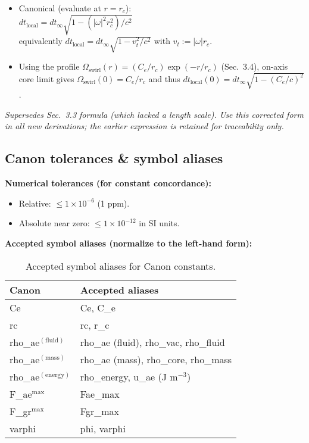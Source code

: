 \documentclass[11pt, a4paper]{article}
\begin{document}
\begin{itemize}
    \item Canonical (evaluate at $r = r_c$):\\
    $dt_{\text{local}} = dt_{\infty} \sqrt{1 - (|\omega|^2 r_c^2)/c^2}$\\
    equivalently $dt_{\text{local}} = dt_{\infty} \sqrt{1 - v_t^2/c^2}$ with $v_t := |\omega| r_c$.
    \item Using the profile $\Omega_{\text{swirl}}(r) = (C_e/r_c) \exp(-r/r_c)$ (Sec.~3.4), on-axis core limit gives $\Omega_{\text{swirl}}(0) = C_e/r_c$ and thus $dt_{\text{local}}(0) = dt_{\infty} \sqrt{1 - (C_e/c)^2}$.
\end{itemize}

\textit{Supersedes Sec.~3.3 formula (which lacked a length scale). Use this corrected form in all new derivations; the earlier expression is retained for traceability only.}

\subsection*{ Canon tolerances \& symbol aliases}

\textbf{Numerical tolerances (for constant concordance):}
\begin{itemize}
    \item Relative: $\leq 1\times 10^{-6}$ (1 ppm).
    \item Absolute near zero: $\leq 1\times 10^{-12}$ in SI units.
\end{itemize}

\textbf{Accepted symbol aliases (normalize to the left-hand form):}

\begin{table}[h!]
\centering
\begin{tabular}{|l|l|}
\hline
\textbf{Canon} & \textbf{Accepted aliases} \\
\hline
Ce & Ce, C\_e \\
rc & rc, r\_c \\
rho\_ae$^{(\text{fluid})}$ & rho\_ae (fluid), rho\_vac, rho\_fluid \\
rho\_ae$^{(\text{mass})}$ & rho\_ae (mass), rho\_core, rho\_mass \\
rho\_ae$^{(\text{energy})}$ & rho\_energy, u\_ae (J m$^{-3}$) \\
F\_ae$^{\max}$ & Fae\_max \\
F\_gr$^{\max}$ & Fgr\_max \\
varphi & phi, varphi \\
\hline
\end{tabular}
\caption{Accepted symbol aliases for Canon constants.}
\end{table}
\end{document}

